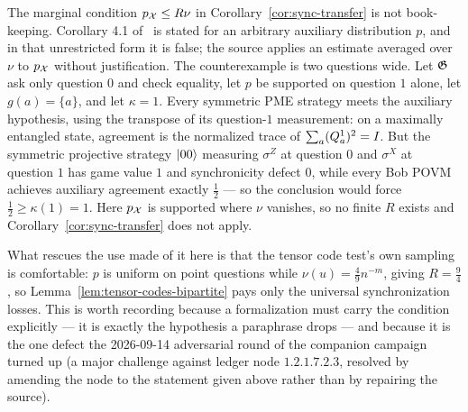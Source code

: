 \begin{remark}
\label{rem:sync-transfer-marginal}
The marginal condition $p_{\mathcal{X}} \leq R\nu$ in Corollary~\ref{cor:sync-transfer} is not
book-keeping. Corollary 4.1 of~\cite{Vid22} is stated for an arbitrary auxiliary distribution
$p$, and in that unrestricted form it is false; the source applies an estimate averaged over
$\nu$ to $p_{\mathcal{X}}$ without justification. The counterexample is two questions wide. Let
$\mathfrak{G}$ ask only question $0$ and check equality, let $p$ be supported on question $1$ alone,
let $g(a) = \{a\}$, and let $\kappa = 1$. Every symmetric PME strategy meets the
auxiliary hypothesis, using the transpose of its question-$1$ measurement: on a
maximally entangled state, agreement is the normalized trace of
$\sum_a (Q^1_a)^2=I$. But the
symmetric projective strategy $|00\rangle$ measuring $\sigma^Z$ at question $0$ and $\sigma^X$
at question $1$ has game value $1$ and synchronicity defect $0$, while every Bob POVM achieves
auxiliary agreement exactly $\tfrac12$ --- so the conclusion would force
$\tfrac12 \geq \kappa(1) = 1$. Here $p_{\mathcal{X}}$ is supported where $\nu$ vanishes, so no finite
$R$ exists and Corollary~\ref{cor:sync-transfer} does not apply.

What rescues the use made of it here is that the tensor code test's own sampling is
comfortable: $p$ is uniform on point questions while $\nu(u) = \tfrac49 n^{-m}$, giving
$R = \tfrac94$, so Lemma~\ref{lem:tensor-codes-bipartite} pays only the universal
synchronization losses. This is worth recording because a formalization must carry the
condition explicitly --- it is exactly the hypothesis a paraphrase drops --- and because it is
the one defect the 2026-09-14 adversarial round of the companion campaign turned up (a major
challenge against ledger node $1.2.1.7.2.3$, resolved by amending the node to the statement
given above rather than by repairing the source).
\end{remark}

